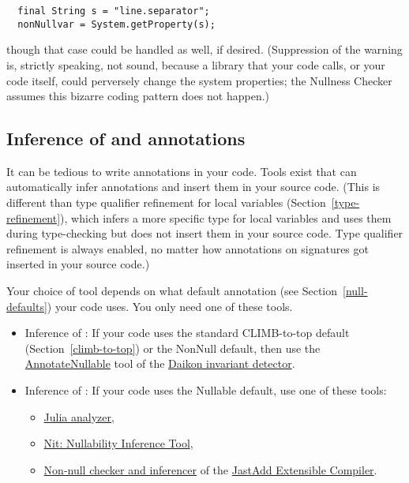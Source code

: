 \begin{Verbatim}
  final String s = "line.separator";
  nonNullvar = System.getProperty(s);
\end{Verbatim}

\noindent
though that case could be handled as well, if desired.
(Suppression of the warning is, strictly speaking, not sound, because a
library that your code calls, or your code itself, could perversely change
the system properties; the Nullness Checker assumes this bizarre coding
pattern does not happen.)


\subsection{Inference of  and  annotations\label{nullness-inference}}

It can be tedious to write annotations in your code.  Tools exist that
can automatically infer annotations and insert them in your source code.
(This is different than type qualifier refinement for local variables
(Section~\ref{type-refinement}), which infers a more specific type for
local variables and uses them during type-checking but does not insert them
in your source code.  Type qualifier refinement is always enabled, no
matter how annotations on signatures got inserted in your source code.)

Your choice of tool depends on what default annotation (see
Section~\ref{null-defaults}) your code uses.  You only need one of these tools.

\begin{itemize}

\item
  Inference of :
  If your code uses the standard CLIMB-to-top default (Section~\ref{climb-to-top}) or
  the NonNull default, then use the
  \href{http://plse.cs.washington.edu/daikon/download/doc/daikon.html#AnnotateNullable}{AnnotateNullable}
  tool of the \href{http://plse.cs.washington.edu/daikon/}{Daikon invariant
    detector}.

\item
  Inference of :
  If your code uses the Nullable default, use one of these tools:
\begin{itemize}
\item
  \href{https://www.juliasoft.com/eng}{Julia analyzer},
\item
  \href{http://nit.gforge.inria.fr}{Nit: Nullability Inference Tool},
\item
  \href{http://jastadd.org/jastadd-tutorial-examples/non-null-types-for-java/}{Non-null
    checker and inferencer} of the \href{http://jastadd.org/}{JastAdd
    Extensible Compiler}.
\end{itemize}

\end{itemize}



